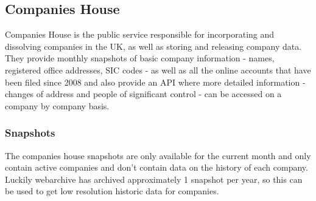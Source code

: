 \documentclass[a4paper,10pt]{article}
\begin{document}
   \subsection{Companies House}
   Companies House is the public service responsible for incorporating and dissolving companies in the UK, as well as storing and releasing company data. They provide monthly snapshots of basic company information - names, registered office addresses, SIC codes - as well as all the online accounts that have been filed since 2008 and also provide an API where more detailed information - changes of address and people of significant control - can be accessed on a company by company basis.
   \subsubsection{Snapshots}
   The companies house snapshots \cite{companieshousesnapshots} are only available for the current month and only contain active companies and don't contain data on the history of each company. Luckily webarchive \cite{snapshotarchive} has archived approximately 1 snapshot per year, so this can be used to get low resolution historic data for companies. 
\end{document}
